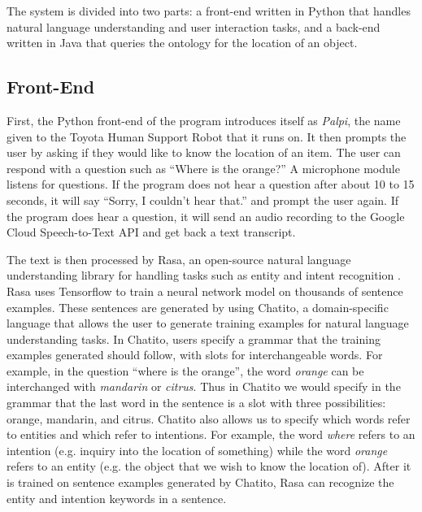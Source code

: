 \documentclass{article}
\begin{document}
The system is divided into two parts: a front-end written in Python that 
handles natural language understanding and user interaction tasks, and a 
back-end written in Java that queries the ontology for the location of an
object. 

\subsection{Front-End}
First, the Python front-end of the program introduces itself as 
\textit{Palpi}, the name given to the Toyota Human Support Robot that it runs 
on. It then prompts the 
user by asking if they would like to know the location of an item. The user 
can respond with a question such as ``Where is the orange?'' A microphone 
module listens for questions. If the program does not hear a question after 
about 10 to 15 seconds, it will say ``Sorry, I couldn't hear that.'' and 
prompt the user again. If the program does hear a question, it will send an 
audio recording to the Google Cloud Speech-to-Text API and get back a text 
transcript.

The text is then processed by Rasa, an open-source natural language 
understanding library for handling tasks such as entity and intent 
recognition \cite{bocklisch2017rasa}. Rasa uses Tensorflow to train a neural 
network model on thousands of sentence examples. These sentences are 
generated by using Chatito, a domain-specific language that allows the user 
to generate training examples for natural language understanding tasks. In 
Chatito, users specify a grammar that the training examples generated should 
follow, with slots for interchangeable words.
For example, in the question ``where is the orange'', the word \textit{orange}
can be interchanged with \textit{mandarin} or \textit{citrus}. Thus in 
Chatito we would specify in the grammar that the last word in the sentence
is a slot with three possibilities: orange, mandarin, and citrus. Chatito 
also allows us to specify which words refer to entities and which refer to
intentions. For example, the word \textit{where} refers to an intention 
(e.g. inquiry into the location of something) while the word \textit{orange}
refers to an entity (e.g. the object that we wish to know the location of).
After it is trained on sentence examples generated by Chatito, Rasa can 
recognize the entity and intention keywords in a sentence.
\end{document}
